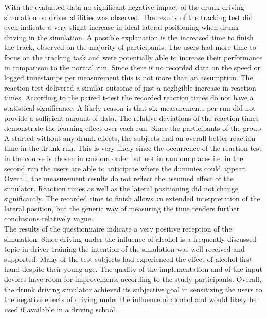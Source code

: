 With the evaluated data no significant negative impact of the drunk driving simulation on driver abilities was observed. 
The results of the tracking test did even indicate a very slight increase in ideal lateral positioning when drunk driving in the simulation.
A possible explanation is the increased time to finish the track, observed on the majority of participants.
The users had more time to focus on the tracking task and were potentially able to increase their performance in comparison to the normal run.
Since there is no recorded data on the speed or logged timestamps per measurement this is not more than an assumption.
The reaction test delivered a similar outcome of just a negligible increase in reaction times.
According to the paired t-test the recorded reaction times do not have a statistical significance.
A likely reason is that six measurements per run did not provide a sufficient amount of data.
The relative deviations of the reaction times demonstrate the learning effect over each run.
Since the participants of the group A started without any drunk effects, the subjects had an overall better reaction time in the drunk run.
This is very likely since the occurrence of the reaction test in the course is chosen in random order but not in random places i.e. in the second run the users are able to anticipate where the dummies could appear.
Overall, the measurement results do not reflect the assumed effect of the simulator.
Reaction times as well as the lateral positioning did not change significantly.
The recorded time to finish allows an extended interpretation of the lateral position, but the generic way of measuring the time renders further conclusions relatively vague.
\\
The results of the questionnaire indicate a very positive reception of the simulation.
Since driving under the influence of alcohol is a frequently discussed topic in driver training the intention of the simulation was well received and supported.
Many of the test subjects had experienced the effect of alcohol first hand despite their young age.
The quality of the implementation and of the input devices have room for improvements according to the study participants. 
Overall, the drunk driving simulator achieved its subjective goal in sensitizing the users to the negative effects of driving under the influence of alcohol and would likely be used if available in a driving school.

